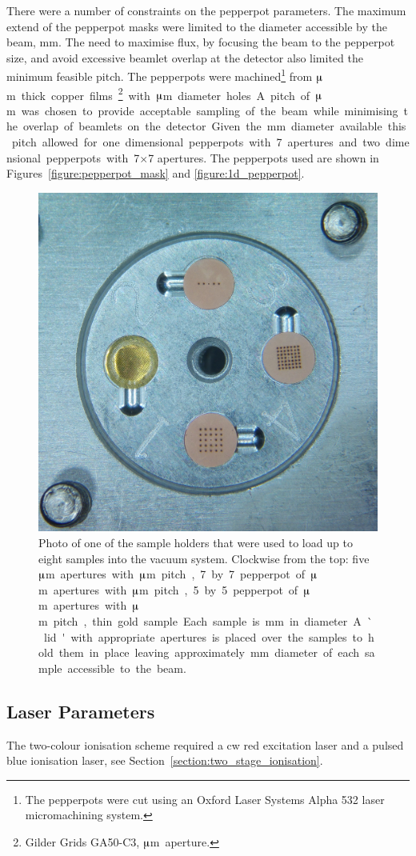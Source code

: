 There were a number of constraints on the pepperpot parameters.
The maximum extend of the pepperpot masks were limited to the diameter accessible by the beam, \unit[2]{mm}.
The need to maximise flux, by focusing the beam to the pepperpot size, and avoid excessive beamlet overlap at the detector also limited the minimum feasible pitch.
The pepperpots were machined\footnote{The pepperpots were cut using an Oxford Laser Systems Alpha 532 laser micromachining system.} from \unit[25]{$\muup$m} thick copper films\footnote{Gilder Grids GA50-C3, \unit[50]{$\muup$m} aperture.} with \unit[50]{$\muup$m} diameter holes.
A pitch of \unit[200]{$\muup$m} was chosen to provide acceptable sampling of the beam while minimising the overlap of beamlets on the detector.
Given the \unit[2]{mm} diameter available this pitch allowed for one dimensional pepperpots with 7 apertures and two dimensional pepperpots with 7$\times$7 apertures.
The pepperpots used are shown in Figures~\ref{figure:pepperpot_mask} and \ref{figure:1d_pepperpot}.

\begin{figure}
    \center
    \includegraphics[width=0.49\linewidth]{part2/Figs/sample_holder.jpg}
    \caption[Sample holder.]{Photo of one of the sample holders that were used to load up to eight samples into the vacuum system. Clockwise from the top: five \unit[50]{$\muup$m} apertures with \unit[300]{$\muup$m} pitch, 7 by 7 pepperpot of \unit[50]{$\muup$m} apertures with \unit[200]{$\muup$m} pitch, 5 by 5 pepperpot of \unit[50]{$\muup$m} apertures with \unit[300]{$\muup$m} pitch, thin gold sample. Each sample is \unit[3]{mm} in diameter. A `lid' with appropriate apertures is placed over the samples to hold them in place leaving approximately \unit[2]{mm} diameter of each sample accessible to the beam.}
    \label{figure:sample_holder_pepperpots}
\end{figure}

\subsection{Laser Parameters}
The two-colour ionisation scheme required a \gls{cw} red excitation laser and a pulsed blue ionisation laser, see Section~\ref{section:two_stage_ionisation}.

